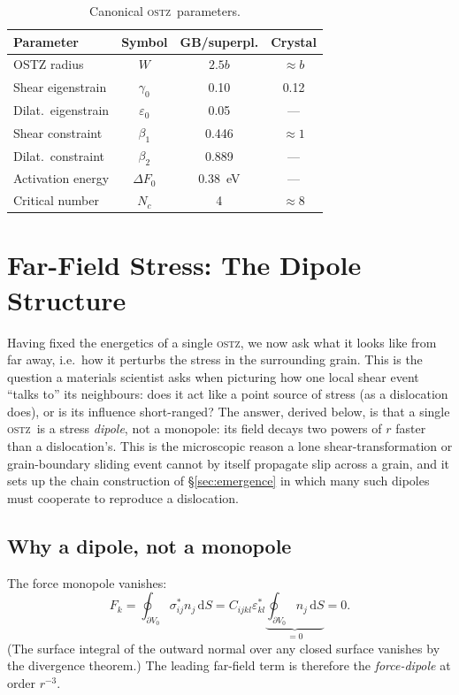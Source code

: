\documentclass[5p,sort&compress]{elsarticle}
\newcommand{\OSTZ}{\textsc{ostz}}
\newcommand{\dF}{\Delta F_0}
\newcommand{\gz}{\gamma_0}
\begin{document}
\begin{table}[htbp]
\centering
\small
\caption{Canonical \OSTZ\ parameters.}
\label{tab:canonical}
\begin{tabular}{lccc}
\toprule
Parameter & Symbol & GB/superpl. & Crystal\\
\midrule
OSTZ radius & $W$ & $2.5b$ & $\approx b$\\
Shear eigenstrain & $\gz$ & 0.10 & 0.12\\
Dilat.\ eigenstrain & $\varepsilon_0$ & 0.05 & ---\\
Shear constraint & $\beta_1$ & 0.446 & $\approx1$\\
Dilat.\ constraint & $\beta_2$ & 0.889 & ---\\
Activation energy & $\dF$ & 0.38~eV & ---\\
Critical number & $N_c$ & 4 & $\approx8$\\
\bottomrule
\end{tabular}
\end{table}

\section{Far-Field Stress: The Dipole Structure}
\label{sec:dipole}

Having fixed the energetics of a single \OSTZ, we now ask what it
looks like from far away, i.e.\ how it perturbs the stress in the
surrounding grain. This is the question a materials scientist asks
when picturing how one local shear event ``talks to'' its neighbours:
does it act like a point source of stress (as a dislocation does),
or is its influence short-ranged? The answer, derived below, is that
a single \OSTZ\ is a stress \emph{dipole}, not a monopole: its field
decays two powers of $r$ faster than a dislocation's. This is the
microscopic reason a lone shear-transformation or grain-boundary
sliding event cannot by itself propagate slip across a grain, and it
sets up the chain construction of \S\ref{sec:emergence} in which many
such dipoles must cooperate to reproduce a dislocation.

\subsection{Why a dipole, not a monopole}

The force monopole vanishes:
\begin{equation}
  F_k=\oint_{\partial V_0}\sigma_{ij}^* n_j\,\mathrm dS
  =C_{ijkl}\varepsilon^*_{kl}
  \underbrace{\oint_{\partial V_0}n_j\,\mathrm dS}_{=0}=0.
  \label{eq:monopole}
\end{equation}
(The surface integral of the outward normal over any closed surface
vanishes by the divergence theorem.) The leading far-field term is
therefore the \emph{force-dipole} at order $r^{-3}$.
\end{document}
